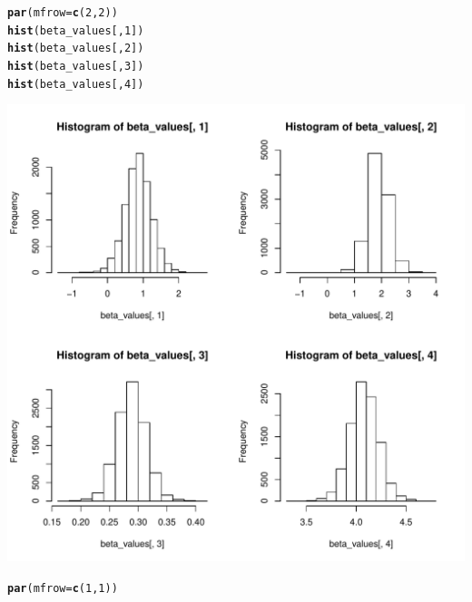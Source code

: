 \documentclass[11pt]{article}\usepackage[]{graphicx}\usepackage[]{color}
\makeatletter
\def\maxwidth{ %
  \ifdim\Gin@nat@width>\linewidth
    \linewidth
  \else
    \Gin@nat@width
  \fi
}
\newcommand{\hlnum}[1]{\textcolor[rgb]{0.686,0.059,0.569}{#1}}%
\newcommand{\hlstd}[1]{\textcolor[rgb]{0.345,0.345,0.345}{#1}}%
\newcommand{\hlkwc}[1]{\textcolor[rgb]{0.333,0.667,0.333}{#1}}%
\newcommand{\hlkwd}[1]{\textcolor[rgb]{0.737,0.353,0.396}{\textbf{#1}}}%
\newenvironment{kframe}{%
 \def\at@end@of@kframe{}%
 \ifinner\ifhmode%
  \def\at@end@of@kframe{\end{minipage}}%
  \begin{minipage}{\columnwidth}%
 \fi\fi%
 \def\FrameCommand##1{\hskip\@totalleftmargin \hskip-\fboxsep
 \colorbox{shadecolor}{##1}\hskip-\fboxsep
     \hskip-\linewidth \hskip-\@totalleftmargin \hskip\columnwidth}%
 \MakeFramed {\advance\hsize-\width
   \@totalleftmargin\z@ \linewidth\hsize
   \@setminipage}}%
 {\par\unskip\endMakeFramed%
 \at@end@of@kframe}
\newenvironment{knitrout}{}{} %
\makeatother
\begin{document}
\begin{knitrout}
\begin{kframe}
\begin{alltt}
\hlkwd{par}\hlstd{(}\hlkwc{mfrow}\hlstd{=}\hlkwd{c}\hlstd{(}\hlnum{2}\hlstd{,}\hlnum{2}\hlstd{))}
\hlkwd{hist}\hlstd{(beta_values[,}\hlnum{1}\hlstd{])}
\hlkwd{hist}\hlstd{(beta_values[,}\hlnum{2}\hlstd{])}
\hlkwd{hist}\hlstd{(beta_values[,}\hlnum{3}\hlstd{])}
\hlkwd{hist}\hlstd{(beta_values[,}\hlnum{4}\hlstd{])}
\end{alltt}
\end{kframe}
\includegraphics[width=\maxwidth]{figure/unnamed-chunk-7-1} 
\begin{kframe}\begin{alltt}
\hlkwd{par}\hlstd{(}\hlkwc{mfrow}\hlstd{=}\hlkwd{c}\hlstd{(}\hlnum{1}\hlstd{,}\hlnum{1}\hlstd{))}
\end{alltt}
\end{kframe}
\end{knitrout}
\end{document}
